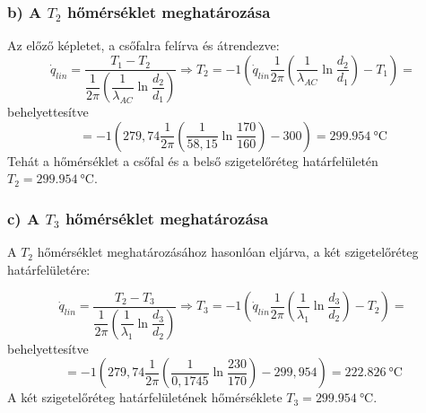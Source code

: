 \subsubsection*{b) A $T_2$ hőmérséklet meghatározása }
Az előző képletet, a csőfalra felírva és átrendezve:
\begin{equation}
	\dot{q}_{lin} = \dfrac {T_1 - T_2}{\dfrac{1}{2 \pi} \left(\dfrac {1}{\lambda_{AC}} \ln \dfrac {d_2}{d_1}\right)} \Rightarrow T_2 = -1 \left(\dot{q}_{lin} \dfrac{1}{2 \pi} \left(\dfrac {1}{\lambda_{AC}} \ln \dfrac {d_2}{d_1}\right) - T_1 \right) = 
\end{equation}
behelyettesítve
\begin{equation*}
	= -1 \left(279,74 \dfrac{1}{2 \pi} \left(\dfrac {1}{58,15} \ln \dfrac {170}{160}\right) - 300 \right) = \SI{299,954}{\celsius}
\end{equation*}
Tehát a hőmérséklet a csőfal és a belső szigetelőréteg határfelületén $T_2 = \SI{299,954}{\celsius}$.


\subsubsection*{c) A $T_3$ hőmérséklet meghatározása }
A $T_2$ hőmérséklet meghatározásához hasonlóan eljárva, a két szigetelőréteg határfelületére:

\begin{equation}
\dot{q}_{lin} = \dfrac {T_2 - T_3}{\dfrac{1}{2 \pi} \left(\dfrac {1}{\lambda_{1}} \ln \dfrac {d_3}{d_2}\right)} \Rightarrow T_3 = -1 \left(\dot{q}_{lin} \dfrac{1}{2 \pi} \left(\dfrac {1}{\lambda_{1}} \ln \dfrac {d_3}{d_2}\right) - T_2 \right) = 
\end{equation}
behelyettesítve
\begin{equation*}
	= -1 \left(279,74 \dfrac{1}{2 \pi} \left(\dfrac {1}{0,1745} \ln \dfrac {230}{170}\right) - 299,954 \right) = \SI{222,826}{\celsius}
\end{equation*}
A két szigetelőréteg határfelületének hőmérséklete $T_3 =\SI{299,954}{\celsius}$. 

\pagebreak

